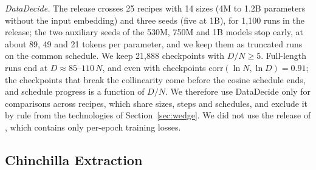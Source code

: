 \textit{DataDecide.} The release \citep{magnusson2025datadecide} crosses 25 recipes with 14 sizes (4M to 1.2B
parameters without the input embedding) and three seeds (five at 1B), for 1,100 runs in the release; the two auxiliary
seeds of the 530M, 750M and 1B models stop early, at about 89, 49 and 21 tokens per parameter, and we keep them as
truncated runs on the common schedule. We keep 21,888 checkpoints with $D/N\ge5$. Full-length runs end at
$D\approx85$--$110\,N$, and even with checkpoints $\mathrm{corr}(\ln N,\ln D)=0.91$; the checkpoints that
break the collinearity come before the cosine schedule ends, and schedule progress is a function of $D/N$. We therefore
use DataDecide only for comparisons across recipes, which share sizes, steps and schedules, and exclude it by rule from
the technologies of Section~\ref{sec:wedge}. We did not use the release of \citet{kricheli2026tokens}, which contains
only per-epoch training losses.

\subsection{Chinchilla Extraction}\label{app:chinchilla}

